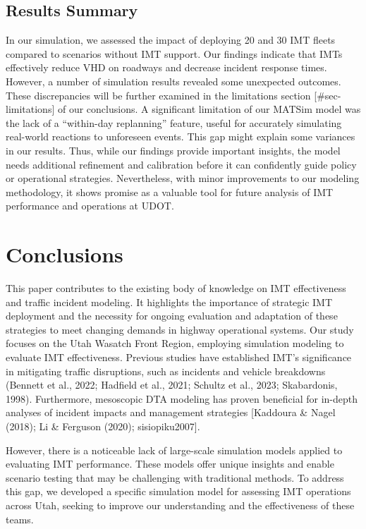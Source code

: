 \documentclass[fancy, oneside, mastersfancy, ms]{byuthesis}
\begin{document}
\hypertarget{results-summary}{%
\section{Results Summary}\label{results-summary}}

In our simulation, we assessed the impact of deploying 20 and 30 IMT
fleets compared to scenarios without IMT support. Our findings indicate
that IMTs effectively reduce VHD on roadways and decrease incident
response times. However, a number of simulation results revealed some
unexpected outcomes. These discrepancies will be further examined in the
limitations section {[}\#sec-limitations{]} of our conclusions. A
significant limitation of our MATSim model was the lack of a
``within-day replanning'' feature, useful for accurately simulating
real-world reactions to unforeseen events. This gap might explain some
variances in our results. Thus, while our findings provide important
insights, the model needs additional refinement and calibration before
it can confidently guide policy or operational strategies. Nevertheless,
with minor improvements to our modeling methodology, it shows promise as
a valuable tool for future analysis of IMT performance and operations at
UDOT.


\hypertarget{sec-conclusions}{%
\chapter{Conclusions}\label{sec-conclusions}}

This paper contributes to the existing body of knowledge on IMT
effectiveness and traffic incident modeling. It highlights the
importance of strategic IMT deployment and the necessity for ongoing
evaluation and adaptation of these strategies to meet changing demands
in highway operational systems. Our study focuses on the Utah Wasatch
Front Region, employing simulation modeling to evaluate IMT
effectiveness. Previous studies have established IMT's significance in
mitigating traffic disruptions, such as incidents and vehicle breakdowns
(Bennett et al., 2022; Hadfield et al., 2021; Schultz et al., 2023;
Skabardonis, 1998). Furthermore, mesoscopic DTA modeling has proven
beneficial for in-depth analyses of incident impacts and management
strategies {[}Kaddoura \& Nagel (2018); Li \& Ferguson (2020);
sisiopiku2007{]}.

However, there is a noticeable lack of large-scale simulation models
applied to evaluating IMT performance. These models offer unique
insights and enable scenario testing that may be challenging with
traditional methods. To address this gap, we developed a specific
simulation model for assessing IMT operations across Utah, seeking to
improve our understanding and the effectiveness of these teams.
\end{document}

